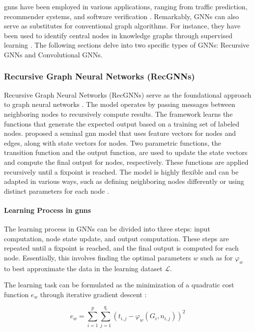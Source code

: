     \acrshort{gnn}s have been employed in various applications, ranging from traffic prediction, recommender systems, and software verification \cite{GNNComprehensiveSurvey20}. Remarkably, GNNs can also serve as substitutes for conventional graph algorithms. For instance, they have been used to identify central nodes in knowledge graphs through supervised learning \cite{KG22}. The following sections delve into two specific types of GNNs: Recursive GNNs and Convolutional GNNs.

    \subsubsection{Recursive Graph Neural Networks (RecGNNs)}
    Recursive Graph Neural Networks (RecGNNs) serve as the foundational approach to graph neural networks \cite{KG22}. The model operates by passing messages between neighboring nodes to recursively compute results. The framework learns the functions that generate the expected output based on a training set of labeled nodes. \citeauthor{GNN08} \cite{GNN08} proposed a seminal \acrshort{gnn} model that uses feature vectors for nodes and edges, along with state vectors for nodes. Two parametric functions, the transition function and the output function, are used to update the state vectors and compute the final output for nodes, respectively. These functions are applied recursively until a fixpoint is reached. The model is highly flexible and can be adapted in various ways, such as defining neighboring nodes differently or using distinct parameters for each node \cite{GNN08}.

    \paragraph{Learning Process in \acrshort{gnn}s}
    The learning process in GNNs can be divided into three steps: input computation, node state update, and output computation. These steps are repeated until a fixpoint is reached, and the final output is computed for each node. Essentially, this involves finding the optimal parameters $ w $ such as for $ \varphi_{w} $ to best approximate the data in the learning dataset $ \mathcal{L} $. 

    \begin{minipage}{\dimexpr\linewidth-20pt}
        The learning task can be formulated as the minimization of a quadratic cost function $ e_{w} $ through iterative gradient descent \cite{GNN08}:
        \par
        \vspace{2em}
        \begin{center}
            \[
            e_{w} = \sum_{i=1}^{p}\sum_{j=1}^{q_{i}}(t_{i,j}-\varphi_{w}(G_{i},n_{i,j}) )^2
            \]
        \end{center}
        \vspace{1em}
    \end{minipage}

